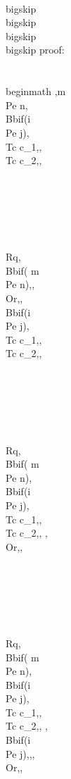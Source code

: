 \\bigskip
\\bigskip
\\bigskip
\\bigskip
proof:\\\\
\\begin{math} 
 ,m \\Pe n, \\Bb{if(i \\Pe j)}{,\\Tc c_1,}{,\\Tc c_2,},\\\\\\\\\\\\
\\Rq, \\Bb{if( m \\Pe n)}{,}{, \\Or,}, \\Bb{if(i \\Pe j)}{,\\Tc c_1,}{,\\Tc c_2,}, \\\\\\\\\\\\
\\Rq, \\Bb{if( m \\Pe n)}{, \\Bb{if(i \\Pe j)}{,\\Tc c_1,}{,\\Tc c_2,}, }{, \\Or,}, \\\\\\\\\\\\
\\Rq, \\Bb{if( m \\Pe n)}{, \\Bb{if(i \\Pe j)}{,\\Tc c_1,}{,\\Tc c_2,}, }{, \\Bb{if(i \\Pe j)}{,}{,}, \\Or,}, \\\\\\\\\\\\\\\\
